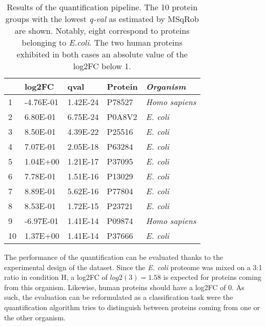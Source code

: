 \begin{table}[ht]
\centering
\begin{tabular}{llll>{\itshape}l}
  \toprule
 & \ac{log2FC} & qval & Protein & Organism \\ 
  \midrule
1 & -4.76E-01 & 1.42E-24 & P78527 & Homo sapiens \\ 
   \rowcolor[gray]{0.95}2 & 6.80E-01 & 6.75E-24 & P0A8V2 & E. coli \\ 
  3 & 8.50E-01 & 4.39E-22 & P25516 & E. coli \\ 
   \rowcolor[gray]{0.95}4 & 7.07E-01 & 2.05E-18 & P63284 & E. coli \\ 
  5 & 1.04E+00 & 1.21E-17 & P37095 & E. coli \\ 
   \rowcolor[gray]{0.95}6 & 7.78E-01 & 1.51E-16 & P13029 & E. coli \\ 
  7 & 8.89E-01 & 5.62E-16 & P77804 & E. coli \\ 
   \rowcolor[gray]{0.95}8 & 8.53E-01 & 1.72E-15 & P23721 & E. coli \\ 
  9 & -6.97E-01 & 1.41E-14 & P09874 & Homo sapiens \\ 
   \rowcolor[gray]{0.95}10 & 1.37E+00 & 1.41E-14 & P37666 & E. coli \\ 
   \bottomrule
\end{tabular}
\caption[Proteome benchmark dataset quantification results]{Results of the quantification pipeline. The 10 protein groups with the lowest \textit{q-val}  as estimated by MSqRob are shown. Notably, eight correspond to proteins belonging to \textit{E.coli}. The two human proteins exhibited in both cases an absolute value of the \ac{log2FC} below 1.}
\label{tab:quantification_table}
\end{table}

The performance of the quantification can be evaluated thanks to the experimental design of the dataset. Since the \textit{E. coli} proteome was mixed on a 3:1 ratio in condition H, a \ac{log2FC} of $log2(3)=1.58$ is expected for proteins coming from this organism. Likewise, human proteins should have a \ac{log2FC} of 0. As such, the evaluation can be reformulated as a classification task were the quantification algorithm tries to distinguish between proteins coming from one or the other organism.



